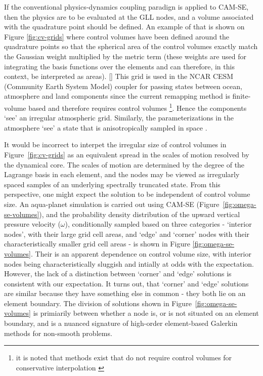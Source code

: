 \documentclass[twocol]{ametsoc}
\begin{document}
If the conventional physics-dynamics coupling paradign is applied to CAM-SE, then the physics are to be evaluated at the GLL nodes, and a volume associated with the quadrature point should be defined. An example of that is shown on Figure \ref{fig:cv-grids} where control volumes have been defined around the quadrature points so that the spherical area of the control volumes exactly match the Gaussian weight multiplied by the metric term (these weights are used for integrating the basis functions over the elements and can therefore, in this context, be interpreted as areas). [{\color{red}{Mark: could we be mathematically more rigorous? perhaps an appendix describing the iterative algorithm?}}] This grid is used in the NCAR CESM (Community Earth System Model) coupler for passing states between ocean, atmosphere and land components since the current remapping method is finite-volume based and therefore requires control volumes {\footnote{it is noted that methods exist that do not require control volumes for conservative interpolation \citep{UT2015MWR}}}. Hence the components `see' an irregular atmospheric grid. Similarly, the parameterizations in the atmosphere `see' a state that is anisotropically sampled in space \citep[see Figure 1 and 5 in ][]{KetAl2008JGR}.%

It would be incorrect to interpet the irregular size of control volumes in Figure~\ref{fig:cv-grids} as an equivalent spread in the scales of motion resolved by the dynamical core. The scales of motion are determined by the degree of the Lagrange basis in each element, and the nodes may be viewed as irregularly spaced samples of an underlying spectrally truncated state. From this perspective, one might expect the solution to be independent of control volume size. An aqua-planet simulation \citep{NH2000ASL,MWO2016JAMES} is carried out using CAM-SE (Figure~\ref{fig:omega-se-volumes}), and the probability density distribution of the upward vertical pressure velocity ($\omega$), conditionally sampled based on three categories - `interior nodes', with their large grid cell areas, and `edge' and `corner' nodes with their characteristically smaller grid cell areas - is shown in Figure \ref{fig:omega-se-volumes}. Their is an apparent dependence on control volume size, with interior nodes being characteristically sluggish and intially at odds with the expectation. However, the lack of a distinction between `corner' and `edge' solutions is consistent with our expectation. It turns out, that `corner' and `edge' solutions are similar because they have something else in common - they both lie on an element boundary. The division of solutions shown in Figure~\ref{fig:omega-se-volumes} is primiarily between whether a node is, or is not situated on an element boundary, and is a nuanced signature of high-order element-based Galerkin methods for non-smooth problems.
\end{document}
